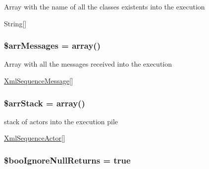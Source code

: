 Array with the name of all the classes existents into the execution

String\mbox{[}\mbox{]} \hypertarget{class_code_instrumentation_receiver_bc2745674d501af3a6d23b496ad9fd05}{
\subsubsection[{\$arrMessages}]{\setlength{\rightskip}{0pt plus 5cm}\$arrMessages = array()}}
\label{class_code_instrumentation_receiver_bc2745674d501af3a6d23b496ad9fd05}


Array with all the messages received into the execution

\hyperlink{class_xml_sequence_message}{XmlSequenceMessage}\mbox{[}\mbox{]} \hypertarget{class_code_instrumentation_receiver_6fe1a7ba669f936d4df438591f632963}{
\subsubsection[{\$arrStack}]{\setlength{\rightskip}{0pt plus 5cm}\$arrStack = array()}}
\label{class_code_instrumentation_receiver_6fe1a7ba669f936d4df438591f632963}


stack of actors into the execution pile

\hyperlink{class_xml_sequence_actor}{XmlSequenceActor}\mbox{[}\mbox{]} \hypertarget{class_code_instrumentation_receiver_c7f35371cd40ca055dee475b121a99c5}{
\subsubsection[{\$booIgnoreNullReturns}]{\setlength{\rightskip}{0pt plus 5cm}\$booIgnoreNullReturns = true}}
\label{class_code_instrumentation_receiver_c7f35371cd40ca055dee475b121a99c5}


